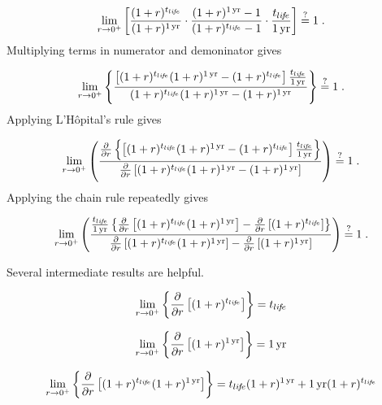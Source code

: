\begin{equation}
  \lim_{r \to 0^+} \left[
  \frac{(1 + r)^{t_{li\!f\!e}}}{(1 + r)^{1\,\mathrm{yr}}} \cdot
  \frac{(1 + r)^{1\,\mathrm{yr}} - 1}{(1 + r)^{t_{li\!f\!e}} - 1} \cdot
  \frac{t_{li\!f\!e}}{1\,\mathrm{yr}}
  \right] \stackrel{?}{=} 1 \; .
\end{equation}
%
Multiplying terms in numerator and demoninator gives

\begin{equation}
  \lim_{r \to 0^+} \left\{
  \frac{\left[(1 + r)^{\tlife} (1 + r)^{\oneyr} - (1 + r)^{\tlife} \right] \frac{\tlife}{\oneyr}}{(1 + r)^{\tlife} (1 + r)^{\oneyr} - (1 + r)^{\oneyr}}
  \right\} \questionequal 1 \; .
\end{equation}
%
Applying L'H\^{o}pital's rule gives

\begin{equation}
  \lim_{r \to 0^+} \left(
  \frac{\frac{\partial}{\partial r} \left\{ \left[(1 + r)^{\tlife} (1 + r)^{\oneyr} - (1 + r)^{\tlife} \right] \frac{\tlife}{\oneyr} \right\}}
  {\frac{\partial}{\partial r} \left[ (1 + r)^{\tlife} (1 + r)^{\oneyr} - (1 + r)^{\oneyr}\right]}
  \right) \questionequal 1 \; .
\end{equation}
%
Applying the chain rule repeatedly gives

\begin{equation}
  \lim_{r \to 0^+} \left(
  \frac{\frac{\tlife}{\oneyr} 
      \left\{ \frac{\partial}{\partial r} \left[  (1 + r)^{\tlife} (1 + r)^{\oneyr} \right]  - 
              \frac{\partial}{\partial r} \left[  (1 + r)^{\tlife} \right] 
      \right\}}
  {\frac{\partial}{\partial r} \left[    (1 + r)^{\tlife} (1 + r)^{\oneyr} \right]  - 
              \frac{\partial}{\partial r} \left[  (1 + r)^{\oneyr} \right] }
  \right) \questionequal 1 \; .
\end{equation}

Several intermediate results are helpful.

\begin{equation}
  \lim_{r \to 0^+} \left\{\frac{\partial}{\partial r} \left[ (1 + r)^{t_{li\!f\!e}} \right] \right\} = t_{li\!f\!e}
\end{equation}

\begin{equation}
  \lim_{r \to 0^+} \left\{\frac{\partial}{\partial r} \left[ (1 + r)^{1\,\mathrm{yr}} \right] \right\} = 1\,\mathrm{yr}
\end{equation}

\begin{equation}
  \lim_{r \to 0^+} \left\{\frac{\partial}{\partial r} \left[ (1 + r)^{t_{li\!f\!e}} (1 + r)^{1\,\mathrm{yr}} \right] \right\} = t_{li\!f\!e} (1 + r)^{1\,\mathrm{yr}}  + 1\,\mathrm{yr} (1 + r)^{t_{li\!f\!e}} 
\end{equation}

